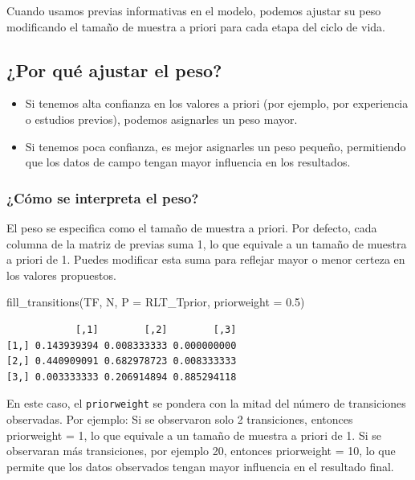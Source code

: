 \documentclass[
  12pt,
  letterpaper,
]{book}
\newenvironment{Shaded}{\begin{snugshade}}{\end{snugshade}}
\newcommand{\AttributeTok}[1]{\textcolor[rgb]{0.40,0.45,0.13}{#1}}
\newcommand{\FloatTok}[1]{\textcolor[rgb]{0.68,0.00,0.00}{#1}}
\newcommand{\FunctionTok}[1]{\textcolor[rgb]{0.28,0.35,0.67}{#1}}
\newcommand{\NormalTok}[1]{\textcolor[rgb]{0.00,0.23,0.31}{#1}}
\providecommand{\tightlist}{%
  \setlength{\itemsep}{0pt}\setlength{\parskip}{0pt}}\usepackage{longtable,booktabs,array}
\begin{document}
Cuando usamos previas informativas en el modelo, podemos ajustar su peso
modificando el tamaño de muestra a priori para cada etapa del ciclo de
vida.

\subsection{¿Por qué ajustar el peso?}\label{por-quuxe9-ajustar-el-peso}

\begin{itemize}
\tightlist
\item
  Si tenemos alta confianza en los valores a priori (por ejemplo, por
  experiencia o estudios previos), podemos asignarles un peso mayor.
\item
  Si tenemos poca confianza, es mejor asignarles un peso pequeño,
  permitiendo que los datos de campo tengan mayor influencia en los
  resultados.
\end{itemize}

\subsubsection{¿Cómo se interpreta el
peso?}\label{cuxf3mo-se-interpreta-el-peso}

El peso se especifica como el tamaño de muestra a priori. Por defecto,
cada columna de la matriz de previas suma 1, lo que equivale a un tamaño
de muestra a priori de 1. Puedes modificar esta suma para reflejar mayor
o menor certeza en los valores propuestos.

\begin{Shaded}
\begin{Highlighting}[]
\FunctionTok{fill\_transitions}\NormalTok{(TF, N, }\AttributeTok{P =}\NormalTok{ RLT\_Tprior, }\AttributeTok{priorweight =} \FloatTok{0.5}\NormalTok{)}
\end{Highlighting}
\end{Shaded}

\begin{verbatim}
            [,1]        [,2]        [,3]
[1,] 0.143939394 0.008333333 0.000000000
[2,] 0.440909091 0.682978723 0.008333333
[3,] 0.003333333 0.206914894 0.885294118
\end{verbatim}

En este caso, el \texttt{priorweight} se pondera con la mitad del número
de transiciones observadas. Por ejemplo: Si se observaron solo 2
transiciones, entonces priorweight = 1, lo que equivale a un tamaño de
muestra a priori de 1. Si se observaran más transiciones, por ejemplo
20, entonces priorweight = 10, lo que permite que los datos observados
tengan mayor influencia en el resultado final.
\end{document}

